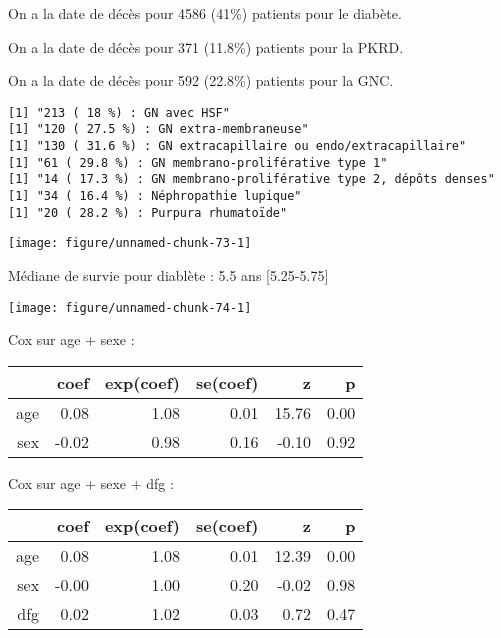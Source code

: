 \documentclass[11pt,a4paper]{article}\usepackage[]{graphicx}\usepackage[]{color}
\makeatletter
\def\maxwidth{ %
  \ifdim\Gin@nat@width>\linewidth
    \linewidth
  \else
    \Gin@nat@width
  \fi
}
\newenvironment{kframe}{%
 \def\at@end@of@kframe{}%
 \ifinner\ifhmode%
  \def\at@end@of@kframe{\end{minipage}}%
  \begin{minipage}{\columnwidth}%
 \fi\fi%
 \def\FrameCommand##1{\hskip\@totalleftmargin \hskip-\fboxsep
 \colorbox{shadecolor}{##1}\hskip-\fboxsep
     \hskip-\linewidth \hskip-\@totalleftmargin \hskip\columnwidth}%
 \MakeFramed {\advance\hsize-\width
   \@totalleftmargin\z@ \linewidth\hsize
   \@setminipage}}%
 {\par\unskip\endMakeFramed%
 \at@end@of@kframe}
\newenvironment{knitrout}{}{} %
\makeatother
\begin{document}
  On a la date de décès pour 4586 (41\%) patients pour le diabète.
  
  On a la date de décès pour 371 (11.8\%) patients pour la PKRD.
  
  On a la date de décès pour 592 (22.8\%) patients pour la GNC.

\begin{knitrout}
\color{fgcolor}\begin{kframe}
\begin{verbatim}
[1] "213 ( 18 %) : GN avec HSF"
[1] "120 ( 27.5 %) : GN extra-membraneuse"
[1] "130 ( 31.6 %) : GN extracapillaire ou endo/extracapillaire"
[1] "61 ( 29.8 %) : GN membrano-proliférative type 1"
[1] "14 ( 17.3 %) : GN membrano-proliférative type 2, dépôts denses"
[1] "34 ( 16.4 %) : Néphropathie lupique"
[1] "20 ( 28.2 %) : Purpura rhumatoïde"
\end{verbatim}
\end{kframe}
\end{knitrout}


\begin{knitrout}
\color{fgcolor}
\texttt{[image: figure/unnamed-chunk-73-1]} 

\end{knitrout}

Médiane de survie pour diablète : 5.5 ans [5.25-5.75]

\begin{knitrout}
\color{fgcolor}
\texttt{[image: figure/unnamed-chunk-74-1]} 

\end{knitrout}

Cox sur age + sexe :
\begin{table}[H]
\centering
\begin{tabular}{rrrrrr}
  \hline
 & coef & exp(coef) & se(coef) & z & p \\ 
  \hline
age & 0.08 & 1.08 & 0.01 & 15.76 & 0.00 \\ 
  sex & -0.02 & 0.98 & 0.16 & -0.10 & 0.92 \\ 
   \hline
\end{tabular}
\end{table}


Cox sur age + sexe + dfg :
\begin{table}[H]
\centering
\begin{tabular}{rrrrrr}
  \hline
 & coef & exp(coef) & se(coef) & z & p \\ 
  \hline
age & 0.08 & 1.08 & 0.01 & 12.39 & 0.00 \\ 
  sex & -0.00 & 1.00 & 0.20 & -0.02 & 0.98 \\ 
  dfg & 0.02 & 1.02 & 0.03 & 0.72 & 0.47 \\ 
   \hline
\end{tabular}
\end{table}
\end{document}
